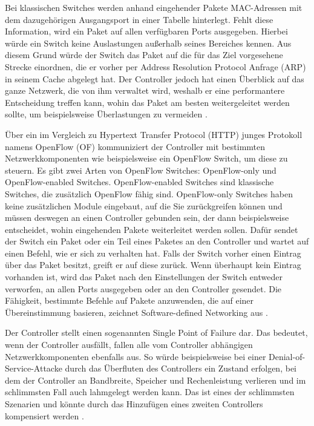 \documentclass[fontsize=12pt,paper=a4,open=any,parskip=half,
  twoside=false,toc=listof,toc=bibliography,fleqn,leqno,
  captions=nooneline,captions=tableabove,british]{scrbook}
\begin{document}
Bei klassischen Switches werden anhand eingehender Pakete MAC-Adressen mit dem dazugehörigen Ausgangsport in einer Tabelle hinterlegt. Fehlt diese Information, wird ein Paket auf allen verfügbaren Ports ausgegeben. Hierbei würde ein Switch keine Auslastungen außerhalb seines Bereiches kennen. Aus diesem Grund würde der Switch das Paket auf die für das Ziel vorgesehene Strecke einordnen, die er vorher per Address Resolution Protocol Anfrage (ARP) in seinem Cache abgelegt hat. Der Controller jedoch hat einen Überblick auf das ganze Netzwerk, die von ihm verwaltet wird, weshalb er eine performantere Entscheidung treffen kann, wohin das Paket am besten weitergeleitet werden sollte, um beispielsweise Überlastungen zu vermeiden \cite[1-2]{sdn1}. \par
Über ein im Vergleich zu Hypertext Transfer Protocol (HTTP) junges Protokoll namens OpenFlow (OF) kommuniziert der Controller mit bestimmten Netzwerkkomponenten wie beispielsweise ein OpenFlow Switch, um diese zu steuern. Es gibt zwei Arten von OpenFlow Switches: OpenFlow-only und OpenFlow-enabled Switches. OpenFlow-enabled Switches sind klassische Switches, die zusätzlich OpenFlow fähig sind. OpenFlow-only Switches haben keine zusätzlichen Module eingebaut, auf die Sie zurückgreifen können und müssen deswegen an einen Controller gebunden sein, der dann beispielsweise entscheidet, wohin eingehenden Pakete weiterleitet werden sollen. Dafür sendet der Switch ein Paket oder ein Teil eines Paketes an den Controller und wartet auf einen Befehl, wie er sich zu verhalten hat. Falls der Switch vorher einen Eintrag über das Paket besitzt, greift er auf diese zurück. Wenn überhaupt kein Eintrag vorhanden ist, wird das Paket nach den Einstellungen der Switch entweder verworfen, an allen Ports ausgegeben oder an den Controller gesendet. Die Fähigkeit, bestimmte Befehle auf Pakete anzuwenden, die auf einer Übereinstimmung basieren, zeichnet Software-defined Networking aus \cite[9-10]{sdn2}. \par
Der Controller stellt einen sogenannten Single Point of Failure dar. Das bedeutet, wenn der Controller ausfällt, fallen alle vom Controller abhängigen Netzwerkkomponenten ebenfalls aus. So würde beispielsweise bei einer Denial-of-Service-Attacke durch das Überfluten des Controllers ein Zustand erfolgen, bei dem der Controller an Bandbreite, Speicher und Rechenleistung verlieren und im schlimmsten Fall auch lahmgelegt werden kann. Das ist eines der schlimmsten Szenarien und könnte durch das Hinzufügen eines zweiten Controllers kompensiert werden \cite[3]{sdn3}.
\end{document}
